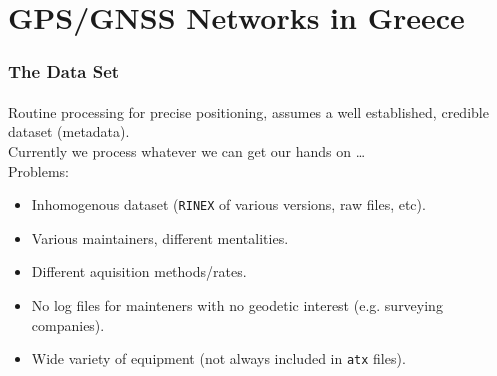 %

\section{GPS/GNSS Networks in Greece}
\begin{frame}\frametitle{The Data Set}\framesubtitle{}
\vskip-1.5cm
  Routine processing for precise positioning, assumes a well established, 
  credible dataset (metadata). \\
  \bigskip
  Currently we process whatever we can get our hands on \ldots\\
  Problems:
  \begin{itemize}
    \item Inhomogenous dataset (\texttt{RINEX} of various versions, raw files, etc).
    \item Various maintainers, different mentalities.
    \item Different aquisition methods/rates.
    \item No log files for mainteners with no geodetic interest (e.g. surveying companies).
    \item Wide variety of equipment (not always included in \texttt{atx} files).
  \end{itemize}
\end{frame}
\note


